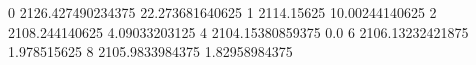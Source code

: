 0 2126.427490234375 22.273681640625
1 2114.15625 10.00244140625
2 2108.244140625 4.09033203125
4 2104.15380859375 0.0
6 2106.13232421875 1.978515625
8 2105.9833984375 1.82958984375
